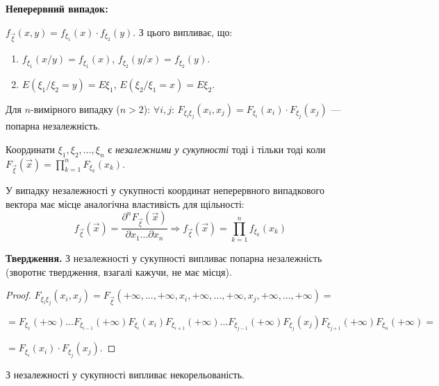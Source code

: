 \noindent\textbf{Неперервний випадок: }

$f_{\vec{\xi}}(x, y) = f_{\xi_1}(x)\cdot f_{\xi_2}(y)$.
З цього випливає, що:

\begin{enumerate}
    \item $f_{\xi_1}(x/y) = f_{\xi_1}(x)$,    
    $f_{\xi_2}(y/x) = f_{\xi_2}(y)$.
    \item $E(\xi_1 / \xi_2 = y) = E\xi_1$, 
    $E(\xi_2 / \xi_1 = x) = E\xi_2$.
\end{enumerate}

\noindent Для $n$-вимірного випадку ($n > 2$):
$\forall i,j$: $F_{\xi_i\xi_j}(x_i, x_j) = F_{\xi_i}(x_i)\cdot F_{\xi_j}(x_j)$ --- 
попарна незалежність.

\begin{definition}
    Координати $\xi_1, \xi_2, ..., \xi_n$ є \emph{незалежними у сукупності} 
    тоді і тільки тоді коли $F_{\vec{\xi}}(\vec{x}) = 
    \prod\limits_{k=1}^n F_{\xi_k}(x_k)$.
\end{definition}
У випадку незалежності у сукупності координат неперервного випадкового вектора має місце аналогічна
властивість для щільності:
\begin{equation*}
    f_{\vec{\xi}}(\vec{x}) = \frac{\partial^nF_{\vec{\xi}}(\vec{x})}
    {\partial x_1...\partial x_n} \Rightarrow 
    f_{\vec{\xi}}(\vec{x}) = \prod\limits_{k=1}^n f_{\xi_k}(x_k)
\end{equation*}

\noindent\textbf{Твердження.}
    З незалежності у сукупності випливає попарна незалежність
    (зворотнє твердження, взагалі кажучи, не має місця).
\begin{proof}
    $F_{\xi_i\xi_j}(x_i, x_j) = F_{\vec{\xi}}(+\infty, ..., +\infty, x_i, 
    +\infty, ..., +\infty, x_j, +\infty, ..., +\infty) = $

    $= F_{\xi_1}(+\infty)...F_{\xi_{i-1}}(+\infty)F_{\xi_i}(x_i)
    F_{\xi_{i+1}}(+\infty)...F_{\xi_{j-1}}(+\infty)F_{\xi_{j}}(x_j)
    F_{\xi_{j+1}}(+\infty)F_{\xi_n}(+\infty) = $
    
    $= F_{\xi_i}(x_i)\cdot F_{\xi_j}(x_j)$.
\end{proof}

\begin{remark}
    З незалежності у сукупності випливає некорельованість.
\end{remark}